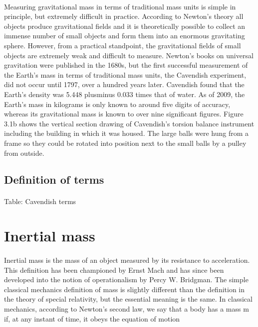 \documentclass{book}
\begin{document}
	\paragraph{}
	Measuring gravitational mass in terms of traditional mass units is simple in principle, but extremely difficult in practice. According to Newton's theory all objects produce gravitational fields and it is theoretically possible to collect an immense number of small objects and form them into an enormous gravitating sphere. However, from a practical standpoint, the gravitational fields of small objects are extremely weak and difficult to measure. Newton's books on universal gravitation were published in the 1680s, but the first successful measurement of the Earth's mass in terms of traditional mass units, the Cavendish experiment, did not occur until 1797, over a hundred years later. Cavendish found that the Earth's density was 5.448 plusminus 0.033 times that of water. As of 2009, the Earth's mass in kilograms is only known to around five digits of accuracy, whereas its gravitational mass is known to over nine significant figures.  Figure 3.1b shows the vertical section drawing of Cavendish's torsion balance instrument including the building in which it was housed. The large balls were hung from a frame so they could be rotated into position next to the small balls by a pulley from outside.
	
	\subsection{Definition of terms}
	\paragraph{}
	Table: Cavendish terms
	
	\section{Inertial mass}
	\paragraph{}
	Inertial mass is the mass of an object measured by its resistance to acceleration. This definition has been championed by Ernst Mach and has since been developed into the notion of operationalism by Percy W. Bridgman. The simple classical mechanics definition of mass is slightly different than the definition in the theory of special relativity, but the essential meaning is the same. In classical mechanics, according to Newton's second law, we say that a body has a mass m if, at any instant of time, it obeys the equation of motion
	
\end{document}
